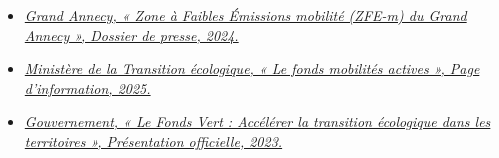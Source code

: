 \documentclass[12pt,a4paper]{article}
\begin{document}
\begin{itemize}
    \item \textit{\href{https://www.grandannecy.fr/fileadmin/mediatheque/kiosque/Espace_presse/CP_ZFE.pdf}{Grand Annecy, « Zone à Faibles Émissions mobilité (ZFE-m) du Grand Annecy », Dossier de presse, 2024.}}
    \item \textit{\href{https://www.ecologie.gouv.fr/politiques-publiques/fonds-mobilites-actives}{Ministère de la Transition écologique, « Le fonds mobilités actives », Page d'information, 2025.}}
    \item \textit{\href{https://www.val-doise.gouv.fr/index.php/contenu/telechargement/26988/204184/file/PPT\%20fonds\%20verts_ZFE_covoiturage_v1.pdf}{Gouvernement, « Le Fonds Vert : Accélérer la transition écologique dans les territoires », Présentation officielle, 2023.}}
\end{itemize}


\newpage
\printbibliography
\end{document}
